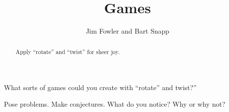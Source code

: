 \documentclass{ximera}
\title{Games}
\author{Jim Fowler and Bart Snapp}
\begin{document}
\begin{abstract}
  Apply ``rotate'' and ``twist'' for sheer joy.
\end{abstract}

\maketitle

\begin{question}
What sorts of games could you create with ``rotate'' and twist?''

  \begin{freeResponse}
  \end{freeResponse}
\end{question}

\begin{question}
  Pose problems.  Make conjectures.  What do you notice?  Why or why not?

  \begin{freeResponse}
  \end{freeResponse}
\end{question}
\end{document}
